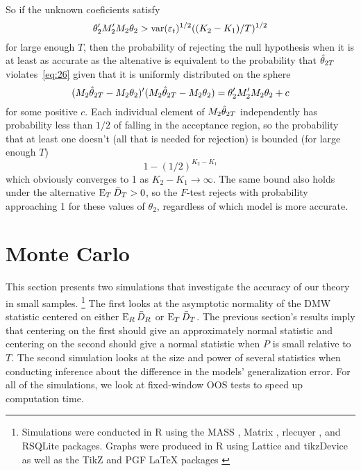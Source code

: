 \documentclass[12pt]{article}
\begin{document}
So if the unknown coeficients satisfy
\begin{equation*}
\theta_2'M_2'M_2\theta_2 > \operatorname{var}(\varepsilon_t)^{1/2} ((K_2 - K_1) / T)^{1/2}
\end{equation*}
for large enough $T$, then the probability of rejecting the null
hypothesis when it is at least as accurate as the altenative is
equivalent to the probability that $\hat\theta_{2T}$ violates~\eqref{eq:26}
given that it is uniformly distributed on the sphere
\begin{equation*}
  (M_2 \hat\theta_{2T} - M_2 \theta_2)'(M_2 \hat\theta_{2T} - M_2 \theta_2) =
  \theta_2'M_2' M_2 \theta_2 + c
\end{equation*}
for some positive $c$. Each individual element of $M_2 \hat\theta_{2T}$
independently has probability less than $1/2$ of falling in the
acceptance region, so the probability that at least one doesn't (all
that is needed for rejection) is bounded (for large enough $T$)
\begin{equation*}
  1 - (1/2)^{K_2 - K_1}
\end{equation*}
which obviously converges to 1 as $K_2 - K_1 \to \infty$. The same
bound also holds under the alternative $\operatorname{E}_T \bar{D}_{T} > 0$, so the
$F$-test rejects with probability approaching 1 for these values of
$\theta_2$, regardless of which model is more accurate.

\section{Monte Carlo}
\label{sec:mc}

This section presents two simulations that investigate the accuracy of
our theory in small samples.%
\footnote{Simulations were conducted in R \citep{Rde:10} using the
  MASS \citep{VeR:02}, Matrix \citep{BM:13}, rlecuyer \citep{SR:12},
  and RSQLite \citep{Jam:10} packages. Graphs were produced in R using
  Lattice \citep{Sar:10} and tikzDevice \citep{ShB:11:0.6.1} as well
  as the TikZ and PGF LaTeX packages \citep{Tan:10}} %
The first looks at the asymptotic normality of the DMW statistic
centered on either $\operatorname{E}_R \bar{D}_{R}$ or $\operatorname{E}_T \bar{D}_{T}$.  The previous
section's results imply that centering on the first should give an
approximately normal statistic and centering on the second should give
a normal statistic when $P$ is small relative to $T$.  The second
simulation looks at the size and power of several statistics when
conducting inference about the difference in the models'
generalization error.  For all of the simulations, we look at
fixed-window OOS tests to speed up computation time.
\end{document}

